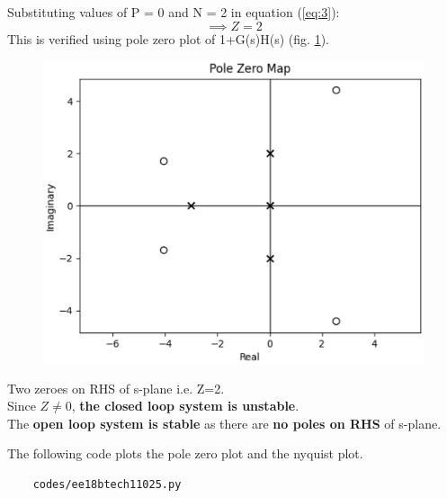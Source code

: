 \begin{enumerate}[label=\thesubsection.\arabic*.,ref=\thesubsection.\theenumi]
Substituting values of P = 0 and N = 2 in equation (\ref{eq:3}):
\begin{equation}
 \implies Z = 2
\end{equation}
This is verified using pole zero plot of 1+G(s)H(s) (fig. \ref{fig:pz1}).
\begin{figure}[ht!]
    \includegraphics[width=\columnwidth]{./figs/ee18btech11025/pzG1.eps}
    \caption{}
    \label{fig:pz1}
\end{figure}
Two zeroes on RHS of s-plane i.e. Z=2. \\
Since $Z\neq0$, \textbf{the closed loop system is unstable}. \\
The \textbf{open loop system is stable} as there are \textbf{no poles on RHS} of s-plane.

The following code plots the pole zero plot and the nyquist plot.
\begin{lstlisting}
    codes/ee18btech11025.py
\end{lstlisting}
\end{enumerate}
